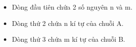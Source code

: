 \begin{itemize}
	\item     Dòng đầu tiên chứa 2 số nguyên n và m.   
	\item     Dòng thứ 2 chứa n kí tự của chuỗi A.   
	\item     Dòng thứ 3 chứa m kí tự của chuỗi B.   
\end{itemize}